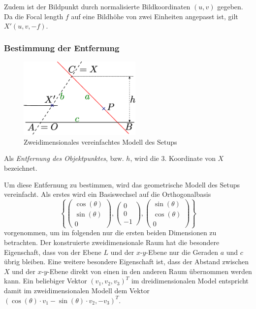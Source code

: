 \documentclass[ngerman,a4paper,parskip=half]{scrartcl}
\begin{document}
Zudem ist der Bildpunkt durch normalisierte Bildkoordinaten $(u, v)$ gegeben. Da die Focal length $f$ auf eine Bildhöhe von zwei Einheiten angepasst ist, gilt $X'(u, v, -f)$.

\subsubsection{Bestimmung der Entfernung}

\begin{figure}
	\centering
	\includegraphics[width=6cm]{includes/triangulation2d}
	\caption{Zweidimensionales vereinfachtes Modell des Setups}
\end{figure}

Als \emph{Entfernung des Objektpunktes}, bzw. $h$, wird die 3. Koordinate von $X$ bezeichnet.

Um diese Entfernung zu bestimmen, wird das geometrische Modell des Setups vereinfacht. Als erstes wird ein Basiswechsel auf die Orthogonalbasis
\[ \left\lbrace \begin{pmatrix}
\cos(\theta) \\ \sin(\theta) \\ 0
\end{pmatrix}, \begin{pmatrix}
0 \\ 0 \\ -1
\end{pmatrix}, \begin{pmatrix}
\sin(\theta) \\ \cos(\theta) \\ 0
\end{pmatrix} \right\rbrace \]
vorgenommen, um im folgenden nur die ersten beiden Dimensionen zu betrachten. Der konstruierte zweidimensionale Raum hat die besondere Eigenschaft, dass von der Ebene $L$ und der $x$-$y$-Ebene nur die Geraden $a$ und $c$ übrig bleiben. Eine weitere besondere Eigenschaft ist, dass der Abstand zwischen $X$ und der $x$-$y$-Ebene direkt von einen in den anderen Raum übernommen werden kann. Ein beliebiger Vektor $(v_1, v_2, v_3)^T$ im dreidimensionalen Model entspricht damit im zweidimensionalen Modell dem Vektor $(\cos(\theta) \cdot v_1 - \sin(\theta) \cdot v_2, -v_3)^T$.
\end{document}
